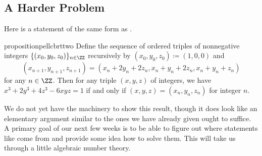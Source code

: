 \documentclass[../notes.tex]{subfiles}
\begin{document}

\subsection{A Harder Problem}
Here is a statement of the same form as .
\begin{restatable}{proposition}{pellcbrttwo} \label{prop:pell-cbrt-2}
	Define the sequence of ordered triples of nonnegative integers $\{(x_0,y_0,z_0)\}_{n\in\ZZ}$ recursively by $(x_0,y_0,z_0)\coloneqq(1,0,0)$ and
	\[(x_{n+1},y_{n+1},z_{n+1})=(x_n+2y_n+2z_n,x_n+y_n+2z_n,x_n+y_n+z_n)\]
	for any $n\in\ZZ$. Then for any triple $(x,y,z)$ of integers, we have $x^3+2y^3+4z^3-6xyz=1$ if and only if $(x,y,z)=(x_n,y_n,z_n)$ for integer $n$.
\end{restatable}
\noindent We do not yet have the machinery to show this result, though it does look like an elementary argument similar to the ones we have already given ought to suffice. A primary goal of our next few weeks is to be able to figure out where statements like  come from and provide some idea how to solve them. This will take us through a little algebraic number theory.
\end{document}
